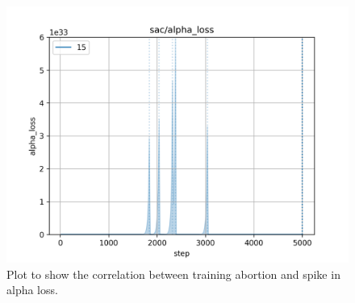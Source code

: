 \begin{figure}[h]
    \begin{center}
        \includegraphics[width=0.5 \linewidth]{figures/appendix/alpha_loss_15.png}
    \end{center}
    \caption[alpha loss with $N = 15$]{Plot to show the correlation between training abortion and spike in alpha loss.}
    \label{fig:alpha_loss_15}
\end{figure}

